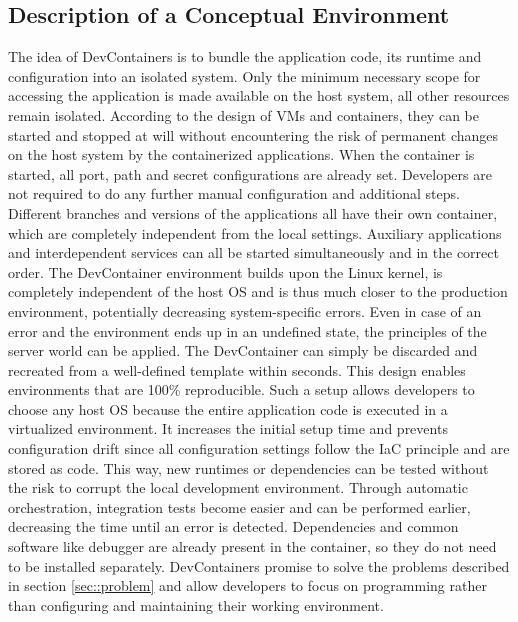     \subsection{Description of a Conceptual Environment}
    The idea of DevContainers is to bundle the application code, its runtime and configuration into an isolated system. Only the minimum necessary scope for accessing the application is made available on the host system, all other resources remain isolated. According to the design of \ac{VM}s and containers, they can be started and stopped at will without encountering the risk of permanent changes on the host system by the containerized applications. When the container is started, all port, path and secret configurations are already set. Developers are not required to do any further manual configuration and additional steps. Different branches and versions of the applications all have their own container, which are completely independent from the local settings. Auxiliary applications and interdependent services can all be started simultaneously and in the correct order. The DevContainer environment builds upon the Linux kernel, is completely independent of the host \ac{OS} and is thus much closer to the production environment, potentially decreasing system-specific errors. Even in case of an error and the environment ends up in an undefined state, the principles of the server world can be applied. The DevContainer can simply be discarded and recreated from a well-defined template within seconds. This design enables environments that are 100\% reproducible.\newline
    Such a setup allows developers to choose any host \acl{OS} because the entire application code is executed in a virtualized environment. It increases the initial setup time and prevents configuration drift since all configuration settings follow the \ac{IaC} principle and are stored as code. This way, new runtimes or dependencies can be tested without the risk to corrupt the local development environment. Through automatic orchestration, integration tests become easier and can be performed earlier, decreasing the time until an error is detected. Dependencies and common software like debugger are already present in the container, so they do not need to be installed separately. DevContainers promise to solve the problems described in section \ref{sec::problem} and allow developers to focus on programming rather than configuring and maintaining their working environment.

